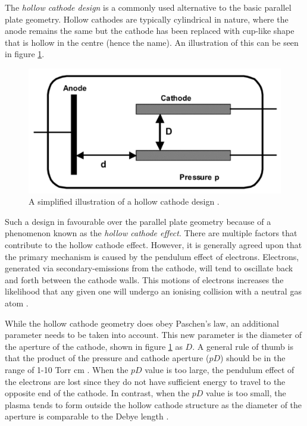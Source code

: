The \textit{hollow cathode design} is a commonly used alternative to the basic parallel plate geometry. Hollow cathodes are typically cylindrical in nature, where the anode remains the same but the cathode has been replaced with cup-like shape that is hollow in the centre (hence the name). An illustration of this can be seen in figure \ref{fig:hollow_cathode_design}. 

\begin{figure}[h!]
	\centering
	\includegraphics[width=0.6\linewidth]{chapter_2/figures/hollow_cathode_illustration.png}
	\caption{A simplified illustration of a hollow cathode design \cite{Becker2006}.}
	\label{fig:hollow_cathode_design}
\end{figure}
 
 Such a design in favourable over the parallel plate geometry because of a phenomenon known as the \textit{hollow cathode effect}. There are multiple factors that contribute to the hollow cathode effect. However, it is generally agreed upon that the primary mechanism is caused by the pendulum effect of electrons. Electrons, generated via secondary-emissions from the cathode, will tend to oscillate back and forth between the cathode walls. This motions of electrons increases the likelihood that any given one will undergo an ionising collision with a neutral gas atom \cite{Arslanbekov1998}.
 
 While the hollow cathode geometry does obey Paschen's law, an additional parameter needs to be taken into account. This new parameter is the diameter of the aperture of the cathode, shown in figure \ref{fig:hollow_cathode_design} as $D$. A general rule of thumb is that the product of the pressure and cathode aperture ($pD$) should be in the range of 1-10 Torr cm \cite{watson_gewartewski_1965}. When the $pD$ value is too large, the pendulum effect of the electrons are lost since they do not have sufficient energy to travel to the opposite end of the cathode. In contrast, when the $pD$ value is too small, the plasma tends to form outside the hollow cathode structure as the diameter of the aperture is comparable to the Debye length \cite{Iza2008}.
 
